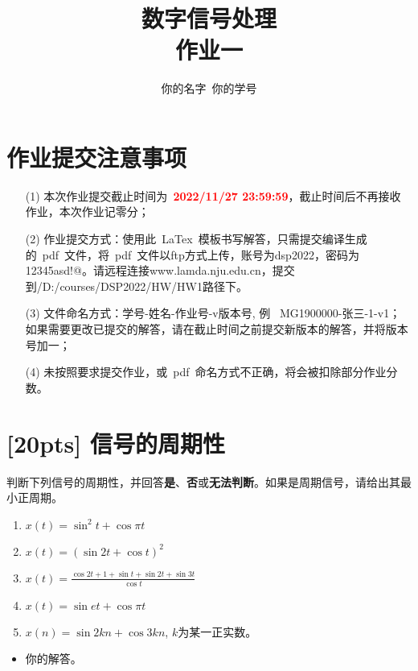 \documentclass[a4paper,UTF8]{article}
\numberwithin{equation}{section}
\begin{document}
\title{数字信号处理\\
作业一}
\author{你的名字\, 你的学号} 
\maketitle

\section*{作业提交注意事项}
\begin{tcolorbox}
\begin{enumerate}
  \item[(1)] 本次作业提交截止时间为~\textcolor{red}{\textbf{2022/11/27  23:59:59}}，截止时间后不再接收作业，本次作业记零分；
  \item[(2)] 作业提交方式：使用此~LaTex~模板书写解答，只需提交编译生成的~pdf~文件，将~pdf~文件以ftp方式上传，账号为dsp2022，密码为12345asd!@。请远程连接www.lamda.nju.edu.cn，提交到/D:/courses/DSP2022/HW/HW1路径下。
  \item[(3)] 文件命名方式：学号-姓名-作业号-v版本号, 例~ MG1900000-张三-1-v1；如果需要更改已提交的解答，请在截止时间之前提交新版本的解答，并将版本号加一；
  \item[(4)] 未按照要求提交作业，或~pdf~命名方式不正确，将会被扣除部分作业分数。

\end{enumerate}
\end{tcolorbox}


\newpage
\section{[20pts] 信号的周期性}
判断下列信号的周期性，并回答\textbf{是}、\textbf{否}或\textbf{无法判断}。如果是周期信号，请给出其最小正周期。
\begin{enumerate}[(1)]
	\item $x(t)=\sin^2t+\cos\pi t$
	\item $x(t)=(\sin2t+\cos t)^2$
	\item $x(t)=\displaystyle\frac{\cos2t+1+\sin t+\sin2t+\sin3t}{\cos t}$
	\item $x(t)=\sin et+\cos\pi t$
	\item $x(n)=\sin 2kn+\cos 3kn$, $k$为某一正实数。
\end{enumerate}

\begin{framed}
\begin{spacing}{1.5}
    \begin{itemize}
    \item 你的解答。
    \end{itemize}
\end{spacing}
\end{framed}
\end{document}

